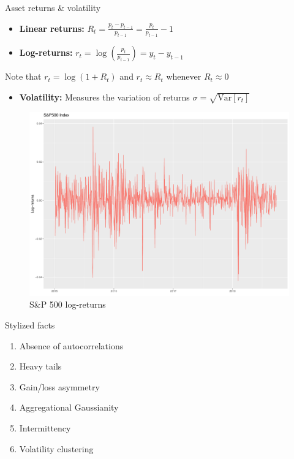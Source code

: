 \documentclass{beamer} %
\begin{document}
\begin{frame}{Asset returns \& volatility}
	\begin{itemize}
		\item \textbf{Linear returns:} $R_t = \frac{p_t - p_{t-1}}{p_{t-1}} = 
		\frac{p_t}{p_{t-1}} - 1$
		
		\item \textbf{Log-returns:} $r_t = \log \left( \frac{p_t}{p_{t-1}} 
		\right) = y_t - y_{t-1}$
	\end{itemize}

	\vspace{.2cm}	
	
	Note that $r_t = \log (1+R_t)$ and $r_t \approx R_t$ whenever $R_t 
	\approx 0$
	
	\vspace{.2cm}
	
	\begin{itemize}
		\item \textbf{Volatility:} Measures the variation of returns $\sigma 
		= \sqrt{\text{Var}[r_t]}$
	\end{itemize}
	
	\begin{figure}
		\centering
		\includegraphics[scale=.2]{../Draft/img/finData/logReturns}
		\caption{S\&P 500 log-returns}
	\end{figure}
\end{frame}

\begin{frame}{Stylized facts}
	\begin{center}
		\begin{enumerate}
			\item Absence of autocorrelations
			\item Heavy tails
			\item Gain/loss asymmetry
			\item Aggregational Gaussianity
			\item Intermittency
			\item Volatility clustering
		\end{enumerate}
	\end{center}

\end{frame}
\end{document}
